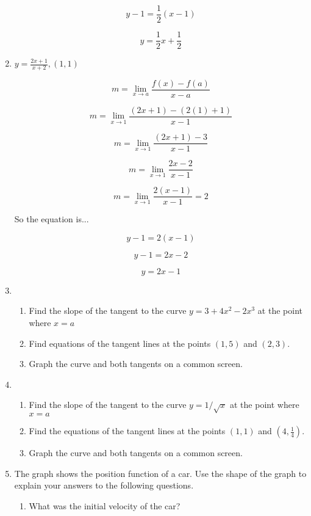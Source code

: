 \documentclass{article}
\begin{document}
\begin{enumerate}
			$$y - 1 = \frac{1}{2}(x-1)$$

			$$y = \frac{1}{2}x + \frac{1}{2}$$

		\item $y = \frac{2x + 1}{x+2}, (1,1)$

			$$m = \lim \limits _{x \to a} \frac{f(x) - f(a)}{x -a}$$

			$$m = \lim \limits _{x \to 1} \frac{(2x+1) - (2(1)+1)}{x-1}$$

			$$m = \lim \limits _{x \to 1} \frac{(2x+1) - 3}{x-1}$$

			$$m = \lim \limits _{x \to 1} \frac{2x-2}{x-1}$$

			$$m = \lim \limits _{x \to 1} \frac{2(x-1)}{x-1} = 2$$

			So the equation is...

			$$y - 1 = 2(x - 1)$$

			$$y - 1 = 2x - 2$$

			$$y = 2x - 1$$

		\item 
			\begin{enumerate}
				\item Find the slope of the tangent to the curve $y = 3 + 4x^2 - 2x^3$
					at the point where $x = a$

				\item Find equations of the tangent lines at the points $(1,5)$ and
					$(2,3)$.

				\item Graph the curve and both tangents on a common screen.
			\end{enumerate}
		\item 
		\begin{enumerate}
			\item Find the slope of the tangent to the curve $y = 1/\sqrt{x}$ at the point
				where $x=a$

			\item Find the equations of the tangent lines at the points $(1,1)$ and $(4, \frac{1}{4})$.

			\item Graph the curve and both tangents on a common screen.
		\end{enumerate}
		\item The graph shows the position function of a car. Use the shape of the graph to explain your
			answers to the following questions.
		\begin{enumerate}
			\item What was the initial velocity of the car?


\end{enumerate}
\end{enumerate}
\end{document}
